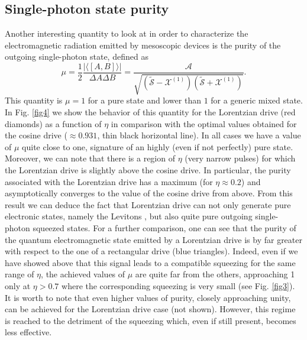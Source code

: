 \documentclass[twocolumn,showpacs,preprintnumbers,amsmath,amssymb%
 aps,
 prb,
 lengthcheck,%
]{revtex4-1}
\def\be{\begin{equation}}
\def\ee{\end{equation}}
\begin{document}
\subsection{Single-photon state purity}
Another interesting quantity to look at in order to characterize the electromagnetic radiation emitted by mesoscopic devices is the purity of the outgoing single-photon state, defined as \cite{grimsmo_quantum_2016} 
\be
\mu= \frac{1}{2} \frac{|\langle\left[A, B\right] \rangle |}{\Delta A \Delta B}=\frac{\mathcal{A}}{\sqrt{\left(\tilde{\mathcal{S}}-\mathcal{X}^{(1)}\right)\left(\tilde{\mathcal{S}}+\mathcal{X}^{(1)}\right)}}.
\label{Purity}
\ee
This quantity is $\mu=1$ for a pure state and lower than $1$ for a generic mixed state. In Fig. \ref{fig4} we show the behavior of this quantity for the Lorentzian drive (red diamonds) as a function of $\eta$ in comparison with the optimal values obtained for the cosine drive ($\approx0.931$, thin black horizontal line). In all cases we have a value of $\mu$ quite close to one, signature of an highly (even if not perfectly) pure state. Moreover, we can note that there is a region of $\eta$ (very narrow pulses) for which the Lorentzian drive is slightly above the cosine drive. In particular, the purity associated with the Lorentzian drive has a maximum (for $\eta\approx 0.2$) and asymptotically converges to the value of the cosine drive from above. From this result we can deduce the fact that Lorentzian drive can not only generate pure electronic states, namely the Levitons \cite{keeling_coherent_2008, dubois_integer_2013, dubois_minimal_2013, jullien_quantum_2014}, but also quite pure outgoing single-photon squeezed states. For a further comparison, one can see that the purity of the quantum electromagnetic state emitted by a Lorentzian drive is by far greater with respect to the one of a rectangular drive (blue triangles). Indeed, even if we have showed above that this signal leads to a compatible squeezing for the same range of $\eta$, the achieved values of $\mu$ are quite far from the others, approaching 1 only at $\eta>0.7$ where the corresponding squeezing is very small (see Fig. \ref{fig3}). It is worth to note that even higher values of purity, closely approaching unity, can be achieved for the Lorentzian drive case (not shown). However, this regime is reached to the detriment of the squeezing which, even if still present, becomes less effective.
\end{document}
